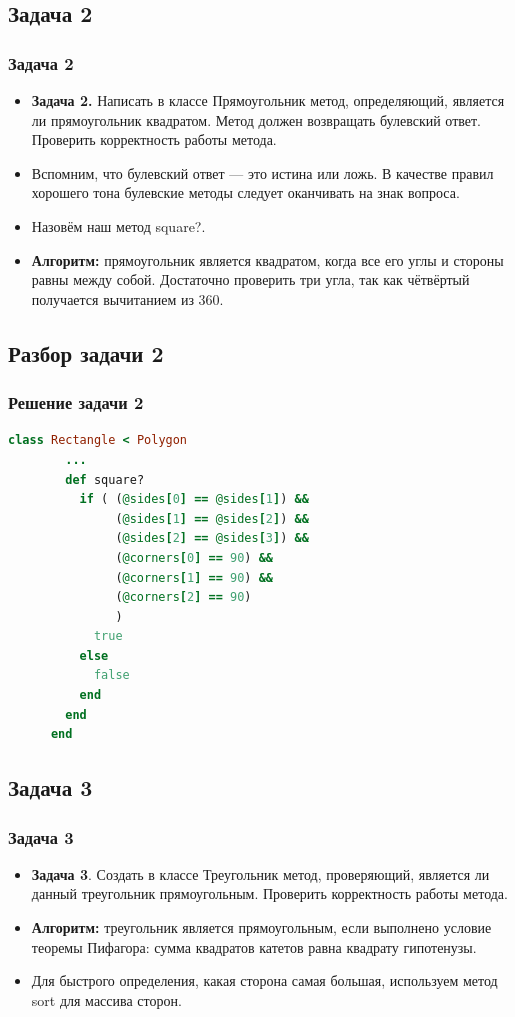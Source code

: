 \documentclass[compress,red]{beamer}
\begin{document}
\subsection{Задача 2}
\begin{frame}[fragile]
  \frametitle{Задача 2}
  \begin{itemize}
    \item \textbf{Задача 2.} Написать в классе Прямоугольник метод, определяющий, является ли прямоугольник квадратом. Метод должен возвращать булевский ответ. Проверить корректность работы метода.
    \item Вспомним, что булевский ответ --- это истина или ложь. В качестве правил хорошего тона булевские методы следует оканчивать на знак вопроса. 
    \item Назовём наш метод square?.
    \item \textbf{Алгоритм:} прямоугольник является квадратом, когда все его углы и стороны равны между собой. Достаточно проверить три угла, так как чётвёртый получается вычитанием из 360.
  \end{itemize}
\end{frame}

\subsection{Разбор задачи 2}
\begin{frame}[fragile]
  \frametitle{Решение задачи 2}
    \scriptsize{
    \begin{lstlisting}[language=ruby,basicstyle=\footnotesize,label=ruby2,caption=Задача 2]
      class Rectangle < Polygon
        ...
        def square?
          if ( (@sides[0] == @sides[1]) &&
               (@sides[1] == @sides[2]) &&
               (@sides[2] == @sides[3]) &&
               (@corners[0] == 90) &&
               (@corners[1] == 90) &&
               (@corners[2] == 90) 
               )
            true
          else
            false
          end
        end
      end
    \end{lstlisting}
    }
\end{frame}

\subsection{Задача 3}
\begin{frame}[fragile]
  \frametitle{Задача 3}
  \begin{itemize}
    \item \textbf{Задача 3}. Создать в классе Треугольник метод, проверяющий, является ли данный треугольник прямоугольным. Проверить корректность работы метода.
    \item \textbf{Алгоритм:} треугольник является прямоугольным, если выполнено условие теоремы Пифагора: сумма квадратов катетов равна квадрату гипотенузы.
    \item Для быстрого определения, какая сторона самая большая, используем метод sort для массива сторон.
  \end{itemize}
\end{frame}
\end{document}
